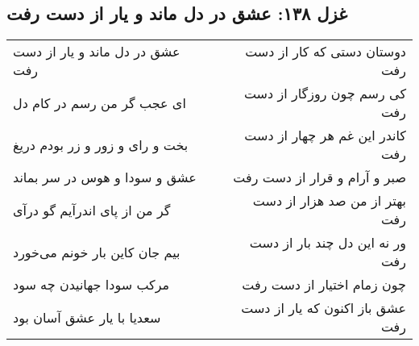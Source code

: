\begin{center}
\section*{غزل ۱۳۸: عشق در دل ماند و یار از دست رفت}
\label{sec:138}
\begin{longtable}{l p{0.5cm} r}
عشق در دل ماند و یار از دست رفت
&&
دوستان دستی که کار از دست رفت
\\
ای عجب گر من رسم در کام دل
&&
کی رسم چون روزگار از دست رفت
\\
بخت و رای و زور و زر بودم دریغ
&&
کاندر این غم هر چهار از دست رفت
\\
عشق و سودا و هوس در سر بماند
&&
صبر و آرام و قرار از دست رفت
\\
گر من از پای اندرآیم گو درآی
&&
بهتر از من صد هزار از دست رفت
\\
بیم جان کاین بار خونم می‌خورد
&&
ور نه این دل چند بار از دست رفت
\\
مرکب سودا جهانیدن چه سود
&&
چون زمام اختیار از دست رفت
\\
سعدیا با یار عشق آسان بود
&&
عشق باز اکنون که یار از دست رفت
\\
\end{longtable}
\end{center}
